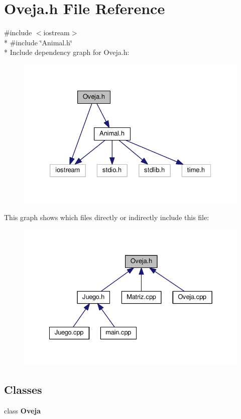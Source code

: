 \section{Oveja.\-h File Reference}
\label{_oveja_8h}
{\ttfamily \#include $<$iostream$>$}\\*
{\ttfamily \#include \char`\"{}Animal.\-h\char`\"{}}\\*
Include dependency graph for Oveja.\-h\-:
\nopagebreak
\begin{figure}[H]
\begin{center}
\leavevmode
\includegraphics[width=326pt]{_oveja_8h__incl}
\end{center}
\end{figure}
This graph shows which files directly or indirectly include this file\-:
\nopagebreak
\begin{figure}[H]
\begin{center}
\leavevmode
\includegraphics[width=334pt]{_oveja_8h__dep__incl}
\end{center}
\end{figure}
\subsection*{Classes}
\begin{DoxyCompactItemize}
\item 
class {\bf Oveja}
\end{DoxyCompactItemize}
